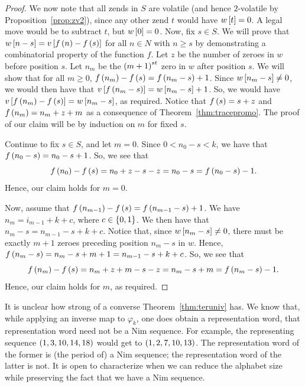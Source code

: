 \documentclass[english,12pt]{article}
\begin{document}
\begin{proof}
We now note that all zends in $S$ are volatile (and hence $2$-volatile by Proposition~\ref{prop:zv2}), since any other zend $t$ would have $w\left[t\right]=0$.  A legal move would be to subtract $t$, but $w\left[0\right]=0$.  Now, fix $s\in S$.  We will prove that $w\left[n-s\right]=v\left[f\left(n\right)-f\left(s\right)\right]$ for all $n\in N$ with $n\geq s$ by demonstrating a combinatorial property of the function $f$.  Let $z$ be the number of zeroes in $w$ before position $s$.  Let $n_m$ be the $\left(m+1\right)^{st}$ zero in $w$ after position $s$.  We will show that for all $m\geq0$, $f\left(n_m\right)-f\left(s\right)=f\left(n_m-s\right)+1$.  Since $w\left[n_m-s\right]\neq0$, we would then have that $v\left[f\left(n_m-s\right)\right]=w\left[n_m-s\right]+1$.  So, we would have $v\left[f\left(n_m\right)-f\left(s\right)\right]=w\left[n_m-s\right]$, as required.  Notice that $f\left(s\right)=s+z$ and $f\left(n_m\right)=n_m+z+m$ as a consequence of Theorem~\ref{thm:tracepromo}.  The proof of our claim will be by induction on $m$ for fixed $s$.

Continue to fix $s\in S$, and let $m=0$.  Since $0<n_0-s<k$, we have that $f\left(n_0-s\right)=n_0-s+1$.  So, we see that
\[
f\left(n_0\right)-f\left(s\right)=n_0+z-s-z=n_0-s=f\left(n_0-s\right)-1.
\]
Hence, our claim holds for $m=0$.

Now, assume that $f\left(n_{m-1}\right)-f\left(s\right)=f\left(n_{m-1}-s\right)+1$.  We have $n_m=i_{m-1}+k+c$, where $c\in\left\{0,1\right\}$.  We then have that $n_m-s=n_{m-1}-s+k+c$.  Notice that, since $w\left[n_m-s\right]\neq0$, there must be exactly $m+1$ zeroes preceding position $n_m-s$ in $w$.  Hence, $f\left(n_m-s\right)=n_m-s+m+1=n_{m-1}-s+k+c$.  So, we see that
\[
f\left(n_m\right)-f\left(s\right)=n_m+z+m-s-z=n_m-s+m=f\left(n_m-s\right)-1.
\]
Hence, our claim holds for $m$, as required.
\end{proof}
It is unclear how strong of a converse Theorem~\ref{thm:teruniv} has.  We know that, while applying an inverse map to $\varphi_k$, one does obtain a representation word, that representation word need not be a Nim sequence.  For example, the representing sequence $\left(1,3,10,14,18\right)$ would get  to $\left(1,2,7,10,13\right)$.  The representation word of the former is (the period of) a Nim sequence; the representation word of the latter is not.  It is open to characterize when we can reduce the alphabet size while preserving the fact that we have a Nim sequence.
\end{document}
